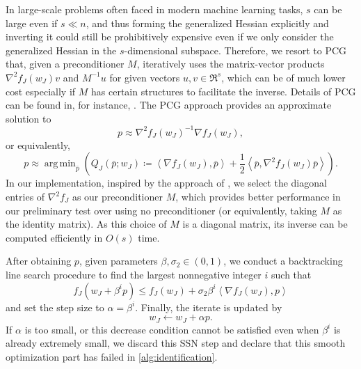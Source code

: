 \documentclass{article}
\theoremstyle{plain}
\theoremstyle{definition}
\theoremstyle{remark}
\newcommand\inner[2]{\left\langle #1, #2 \right\rangle}
\DeclareMathOperator*{\argmin}{arg\,min}
\begin{document}
In large-scale problems often faced in modern machine learning tasks,
$s$ can be large even if $s \ll n$, and thus forming the generalized
Hessian explicitly and inverting it could still be prohibitively
expensive even if we only consider the generalized Hessian in the
$s$-dimensional subspace.
Therefore, we resort to PCG that, given a preconditioner $M$,
iteratively uses the matrix-vector products $\nabla^2 f_J(w_J) v$
and $M^{-1}u$ for given vectors $u,v \in \Re^s$, which can be of much
lower cost especially if $M$ has certain structures to facilitate the
inverse.
Details of PCG can be found in, for instance,
\citet[Chapter~7]{NoceWrig06}.
The PCG approach provides an approximate solution to
\[
	p \approx \nabla^2 f_J(w_J)^{-1} \nabla f_J(w_J),
\]
or equivalently,
\begin{equation}
	p \approx \argmin_{\bar p} \left(Q_J(\bar p; w_J) \coloneqq
	\inner{\nabla f_J(w_J)}{\bar p} +
	\frac12 \inner{\bar p}{\nabla^2 f_J(w_J) \bar p}\right).
	\label{eq:pcg}
\end{equation}
In our implementation, inspired by the approach of \cite{CYH18a}, we
select the diagonal entries of $\nabla^2 f_J$ as our preconditioner
$M$, which provides better performance in our preliminary test over
using no preconditioner (or equivalently, taking $M$ as the identity
matrix).
As this choice of $M$ is a diagonal matrix, its inverse can be
computed efficiently in $O(s)$ time.

After obtaining $p$, given parameters $\beta, \sigma_2 \in (0,1)$,
we conduct a backtracking line search procedure to find the
largest nonnegative integer $i$ such that
\begin{equation}
	\label{eq:armijo}
	f_{J} \left( w_J + \beta^i p \right) \leq f_J \left( w_J
	\right) + \sigma_2 \beta^i \inner{\nabla f_J \left( w_J
	\right)}{p}
\end{equation}
and set the step size to $\alpha = \beta^i$.
Finally, the iterate is updated by
\[w_J \leftarrow w_J + \alpha p.
\]
If $\alpha$ is too small, or this decrease condition cannot be
satisfied even when $\beta^i$ is already extremely small, we
discard this SSN step and declare that this smooth optimization part
has failed in \cref{alg:identification}.
\end{document}
